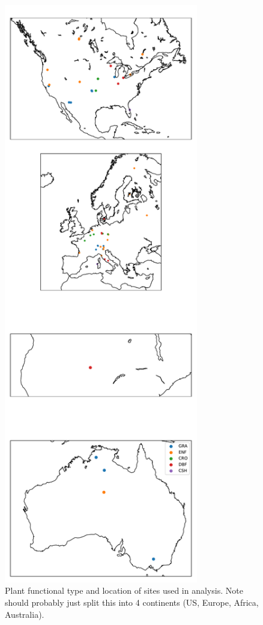 \documentclass[draft,linenumbers]{agujournal}
\begin{document}
\begin{figure}[h]
\centering
\includegraphics[width=20pc]{./fig01.pdf}
\caption{Plant functional type and location of sites used in analysis. Note should probably just split this into 4 continents (US, Europe, Africa, Australia).}
\label{map_fig}
 \end{figure}
\end{document}
